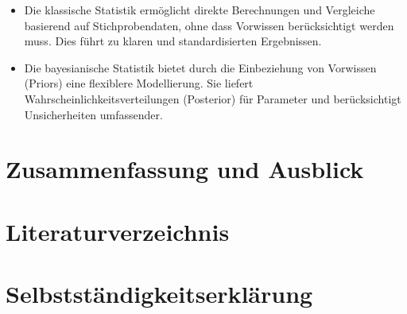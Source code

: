 \documentclass[a4paper,12pt]{article}
\begin{document}
\begin{itemize}
  \item Die klassische Statistik ermöglicht direkte Berechnungen und Vergleiche basierend auf Stichprobendaten, ohne dass Vorwissen berücksichtigt werden muss. Dies führt zu klaren und standardisierten Ergebnissen.
  \item Die bayesianische Statistik bietet durch die Einbeziehung von Vorwissen (Priors) eine flexiblere Modellierung. Sie liefert Wahrscheinlichkeitsverteilungen (Posterior) für Parameter und berücksichtigt Unsicherheiten umfassender.
\end{itemize}

\newpage

\section{Zusammenfassung und Ausblick}

\newpage

\section{Literaturverzeichnis} 

\printbibliography 
\newpage

\section{Selbstständigkeitserklärung}
\end{document}
